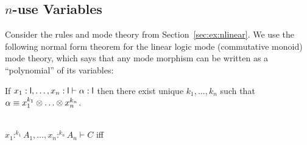 
\subsection{$n$-use Variables}


Consider the rules and mode theory from Section~\ref{sec:ex:nlinear}.
We use the following normal form theorem for the linear logic mode
(commutative monoid) mode theory, which says that any mode morphism can
be written as a ``polynomial'' of its variables:

\begin{lemma} \label{lem:monoid-normal} 
If $x_1 : \mathsf{l},\ldots,x_n : \mathsf{l} \vdash \alpha : \mathsf{l}$ then
there exist unique ${k_1,\ldots,k_n}$ such that $\alpha \equiv x_1^{k_1}
\otimes \ldots \otimes x_n^{k_n}$.
\end{lemma}

\begin{theorem} ~\\
$x_1:^{k_1} A_1,\ldots,x_n :^{k_n} A_n \vdash C$ iff
\end{theorem}

